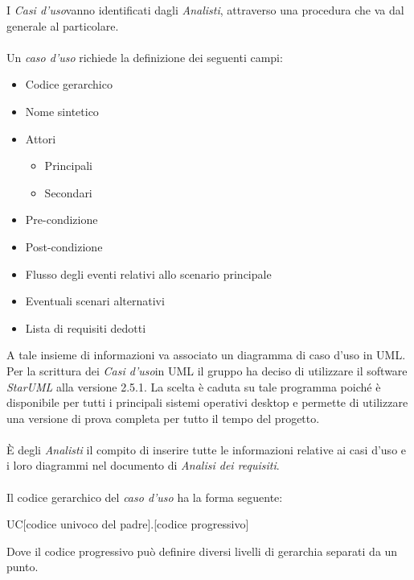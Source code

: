 \documentclass[a4paper]{article}
\newcommand{\UC}{\emph{Casi d'uso}\space}
\begin{document}
			 I \UC vanno identificati dagli \emph{Analisti}, attraverso una procedura che va dal
			 generale al particolare.
			  \\ \\
			 Un \emph{caso d'uso} richiede la definizione dei seguenti campi:
			 \begin{itemize}
			 	\item Codice gerarchico
			 	\item Nome sintetico
			 	\item Attori
			 	\begin{itemize}
			 		\item Principali
			 		\item Secondari
			 	\end{itemize}
			 	\item Pre-condizione
			 	\item Post-condizione
			 	\item Flusso degli eventi relativi allo scenario principale
			 	\item Eventuali scenari alternativi
			 	\item Lista di requisiti dedotti
			 \end{itemize}
			 A tale insieme di informazioni va associato un diagramma di caso d'uso in UML. Per la
			 scrittura dei \UC in UML il gruppo ha deciso di utilizzare il software
			  \emph{StarUML} alla versione 2.5.1. La scelta è  caduta su tale programma poiché
			  è disponibile per tutti i principali sistemi operativi desktop e permette di
			   utilizzare una versione di prova completa per tutto il tempo del progetto.
			  \\ \\
			  È degli \emph{Analisti} il compito di inserire tutte le informazioni relative ai casi
			  d'uso e i loro diagrammi nel documento di \emph{Analisi dei requisiti}.
			  \\ \\
			 Il codice gerarchico del \emph{caso d'uso} ha la forma seguente:
			 \begin{center}
			 	UC[codice univoco del padre].[codice progressivo]
			 \end{center}
			 Dove il codice progressivo può definire diversi livelli di gerarchia separati da un punto.
\end{document}
